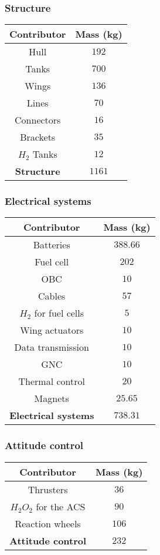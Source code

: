 \subsubsection{Structure}
\begin{center}
\begin{tabular}[H]{|c|c|}
	\hline
	\cellcolor{gray!50}Contributor & \cellcolor{gray!50}Mass (kg)\\
	\hline
	Hull & $192$\\
	\hline
	Tanks & $700$\\
	\hline
	Wings & $136$\\
	\hline
	Lines & $70$\\
	\hline
	Connectors & $16$\\
	\hline
	Brackets & $35$\\
	\hline
	$H_2$ Tanks & $12$\\
	\hline
	\cellcolor{green!30}\textbf{Structure} & \textbf{$1161$}\\
	\hline
\end{tabular}
\end{center}
\subsubsection{Electrical systems}
\begin{center}
\begin{tabular}[H]{|c|c|}
	\hline
	\cellcolor{gray!50}Contributor & \cellcolor{gray!50}Mass (kg)\\
	\hline
	Batteries & $388.66$\\
	\hline
	Fuel cell & $202$\\
	\hline
	OBC & $10$\\
	\hline
	Cables & $57$\\
	\hline
	$H_2$ for fuel cells & $5$\\
	\hline
	Wing actuators & $10$\\
	\hline
	Data transmission & $10$\\
	\hline
	GNC & $10$\\
	\hline
	Thermal control & $20$\\
	\hline
	Magnets & $25.65$\\
	\hline
	\cellcolor{green!30}\textbf{Electrical systems} & \textbf{$738.31$}\\
	\hline
\end{tabular}
\end{center}
\subsubsection{Attitude control}
\begin{center}
\begin{tabular}[H]{|c|c|}
	\hline
	\cellcolor{gray!50}Contributor & \cellcolor{gray!50}Mass (kg)\\
	\hline
	Thrusters & $36$\\
	\hline
	$H_2O_2$ for the ACS & $90$\\
	\hline
	
	Reaction wheels & $106$\\
	\hline
	\cellcolor{green!30}\textbf{Attitude control} & \textbf{$232$}\\
	\hline
\end{tabular}
\end{center}
